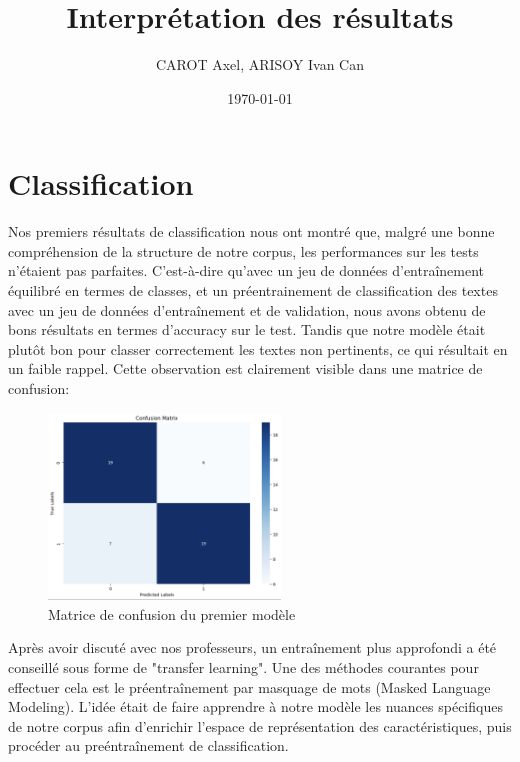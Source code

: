 \documentclass{article}
\title{Interprétation des résultats}
\author{CAROT Axel, ARISOY Ivan Can}
\date{\today}
\begin{document}
\maketitle


\section{Classification}
Nos premiers résultats de classification nous ont montré que, malgré une bonne compréhension de la structure de notre corpus, les performances sur les tests n’étaient pas parfaites. C’est-à-dire qu'avec un jeu de données d'entraînement équilibré en termes de classes, et un préentrainement de classification des textes avec un jeu de données d'entraînement et de validation, nous avons obtenu de bons résultats en termes d’accuracy sur le test. Tandis que notre modèle était plutôt bon pour classer correctement les textes non pertinents, ce qui résultait en un faible rappel. Cette observation est clairement visible dans une matrice de confusion:\\

\begin{figure}[!htbp]
    \centering
    \includegraphics[width=0.55\textwidth]{confusion1.png}
    \caption{Matrice de confusion du premier modèle}
    \label{fig:plots}
\end{figure}

Après avoir discuté avec nos professeurs, un entraînement plus approfondi a été conseillé sous forme de "transfer learning". Une des méthodes courantes pour effectuer cela est le préentraînement par masquage de mots (Masked Language Modeling). L'idée était de faire apprendre à notre modèle les nuances spécifiques de notre corpus afin d'enrichir l'espace de représentation des caractéristiques, puis procéder au preéntraînement de classification.\\
\end{document}
